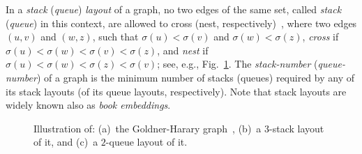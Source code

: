 \documentclass[runningheads]{llncs}
\begin{document}
In a \emph{stack} (\emph{queue}) \emph{layout} of a graph, no two edges of the same set, called \emph{stack} (\emph{queue}) in this context, are allowed to cross (nest, respectively)~\cite{DBLP:journals/siamcomp/HeathR92,DBLP:journals/jcss/Yannakakis89}, where two edges $(u,v)$ and $(w,z)$, such that $\sigma(u)<\sigma(v)$ and $\sigma(w)<\sigma(z)$, \emph{cross} if $\sigma(u)<\sigma(w)<\sigma(v)<\sigma(z)$, and \emph{nest} if $\sigma(u)<\sigma(w)<\sigma(z)<\sigma(v)$; see, e.g., Fig.~\ref{fig:sample}. The \emph{stack-number} (\emph{queue-number}) of a graph is the minimum number of stacks (queues) required by any of its stack layouts (of its queue layouts, respectively). Note that stack layouts are widely known also as \emph{book embeddings}. 

\begin{figure}[t]
	\centering
	\hfil
	\hfil
   \caption{%
   Illustration of:   
   (a)~the Goldner-Harary graph~\cite{GH75},  
   (b)~a $3$-stack layout of it, and
   (c)~a $2$-queue layout of it.}
\label{fig:sample}
\end{figure}
\end{document}
